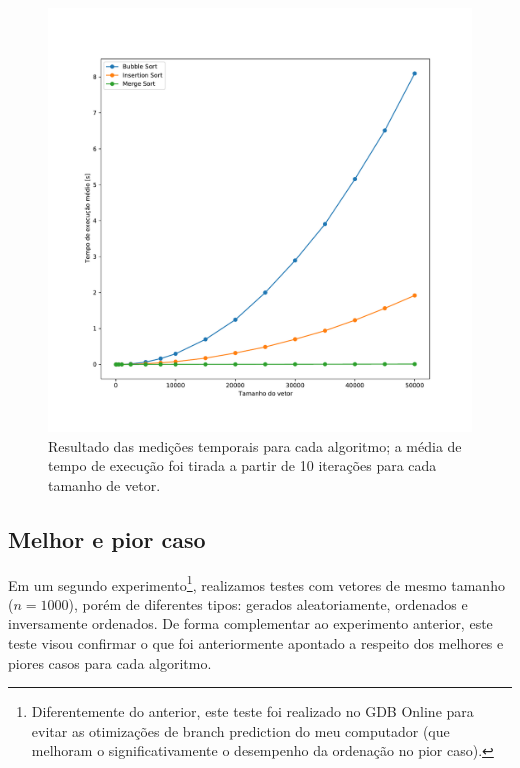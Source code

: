 \documentclass[fontsize=10pt]{article}
\begin{document}
\begin{figure}[H]
\begin{center}
    \includegraphics[scale=0.5]{comparacao.pdf}
    \caption{Resultado das medições temporais para cada algoritmo; a média de tempo de execução foi tirada a partir de 10 iterações para cada tamanho de vetor.}
    \label{Tabela 1}
\end{center}
\end{figure}

\newpage


\subsection{Melhor e pior caso}

\quad Em um segundo experimento\footnote{Diferentemente do anterior, este teste foi realizado no GDB Online para evitar as otimizações de branch prediction do meu computador (que melhoram o significativamente o desempenho da ordenação no pior caso).}, realizamos testes com vetores de mesmo tamanho ($n = 1000$), porém de diferentes tipos: gerados aleatoriamente, ordenados e inversamente ordenados. De forma complementar ao experimento anterior, este teste visou confirmar o que foi anteriormente apontado a respeito dos melhores e piores casos para cada algoritmo.
\end{document}
